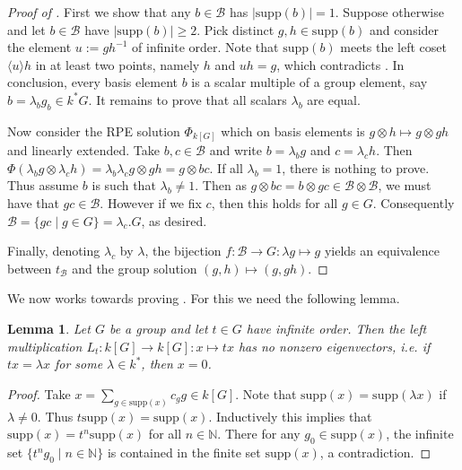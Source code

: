 \documentclass[a4paper,10pt]{amsart}
\newtheorem{lemma}{Lemma}[section]
\theoremstyle{definition}
\theoremstyle{remark}
\newcommand{\Supp}{\mathrm{supp}}
\newcommand\ot{\otimes}
\newcommand\mc{\mathcal}
\newcommand{\N}{{\mathbb N}}
\begin{document}
\begin{proof}[Proof of ]
First we show that any $b \in \mc{B}$ has $|\Supp(b)|=1$. Suppose otherwise and let $b\in \mc{B}$ have $|\Supp(b)|\geq 2$. Pick distinct $g,h\in \Supp(b)$ and consider the element $u:=gh^{-1}$ of infinite order. Note that $\Supp(b)$ meets the left coset $\langle u\rangle h$ in at least two points, namely $h$ and $uh=g$, which contradicts . In conclusion, every basis element $b$ is a scalar multiple of a group element, say $b = \lambda_b g_b \in k^*G$. It remains to prove that all scalars $\lambda_b$ are equal.

Now consider the RPE solution $\Phi_{k[G]}$ which on basis elements is $g \ot h \mapsto g \ot gh$ and linearly extended. Take $b,c \in \mc{B}$ and write $b= \lambda_b g$ and $c= \lambda_c h$. Then $\Phi(\lambda_b g \ot \lambda_c h) = \lambda_b\lambda_c g \ot gh = g \ot bc. $ If all $\lambda_b= 1$, there is nothing to prove. Thus assume $b$ is such that $\lambda_b \neq 1$. Then as $g\ot bc= b \ot gc \in \mc{B} \ot \mc{B}$, we must have that $gc \in \mc{B}$. However if we fix $c$, then this holds for all $g \in G$. Consequently $\mc{B}= \{gc \mid g \in G \}= \lambda_c. G$, as desired.

Finally, denoting $\lambda_c$ by $\lambda$, the bijection $f : \mc{B} \rightarrow G: \lambda g \mapsto g$ yields an equivalence between $t_{\mc{B}}$ and the group solution $(g,h) \mapsto (g,gh).$
\end{proof}

We now works towards proving . For this we need the following lemma. 

\begin{lemma}\label{lem:no-eigen}
Let $G$ be a group and let $t\in G$ have infinite order.
Then the left multiplication $L_t:k[G]\rightarrow k[G]: x \mapsto tx$ has no nonzero eigenvectors, i.e. if $tx=\lambda x$ for some $\lambda\in k^*$, then $x=0$.
\end{lemma}
\begin{proof}
Take $x=\sum_{g\in \Supp(x)} c_g g \in k[G]$. Note that $\Supp(x) = \Supp(\lambda x)$ if $\lambda \neq 0.$ Thus $t \Supp(x) = \Supp(x)$. Inductively this implies that $\Supp(x)= t^n \Supp(x)$ for all $n \in \N.$ There for any $g_0 \in \Supp(x)$, the infinite set $\{ t^n g_0 \mid n \in \N\}$ is contained in the finite set $\Supp(x)$, a contradiction.
\end{proof}
\end{document}
